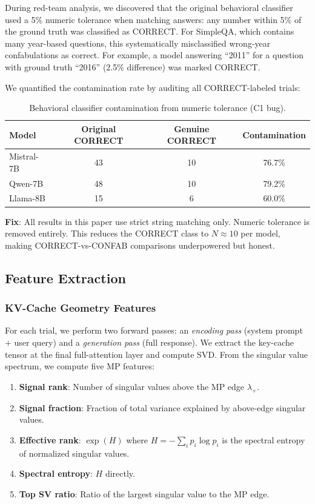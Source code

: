 \documentclass[11pt,a4paper]{article}
\begin{document}
During red-team analysis, we discovered that the original behavioral classifier used a 5\% numeric tolerance when matching answers: any number within 5\% of the ground truth was classified as CORRECT. For SimpleQA, which contains many year-based questions, this systematically misclassified wrong-year confabulations as correct. For example, a model answering ``2011'' for a question with ground truth ``2016'' (2.5\% difference) was marked CORRECT.

We quantified the contamination rate by auditing all CORRECT-labeled trials:

\begin{table}[H]
\centering
\caption{Behavioral classifier contamination from numeric tolerance (C1 bug).}
\label{tab:c1}
\begin{tabular}{lccc}
\toprule
\textbf{Model} & \textbf{Original CORRECT} & \textbf{Genuine CORRECT} & \textbf{Contamination} \\
\midrule
Mistral-7B & 43 & 10 & 76.7\% \\
Qwen-7B & 48 & 10 & 79.2\% \\
Llama-8B & 15 & 6 & 60.0\% \\
\bottomrule
\end{tabular}
\end{table}

\textbf{Fix}: All results in this paper use strict string matching only. Numeric tolerance is removed entirely. This reduces the CORRECT class to $N \approx 10$ per model, making CORRECT-vs-CONFAB comparisons underpowered but honest.

\subsection{Feature Extraction}

\subsubsection{KV-Cache Geometry Features}

For each trial, we perform two forward passes: an \emph{encoding pass} (system prompt + user query) and a \emph{generation pass} (full response). We extract the key-cache tensor at the final full-attention layer and compute SVD. From the singular value spectrum, we compute five MP features:

\begin{enumerate}[nosep]
    \item \textbf{Signal rank}: Number of singular values above the MP edge $\lambda_+$.
    \item \textbf{Signal fraction}: Fraction of total variance explained by above-edge singular values.
    \item \textbf{Effective rank}: $\exp(H)$ where $H = -\sum_i p_i \log p_i$ is the spectral entropy of normalized singular values.
    \item \textbf{Spectral entropy}: $H$ directly.
    \item \textbf{Top SV ratio}: Ratio of the largest singular value to the MP edge.
\end{enumerate}
\end{document}
